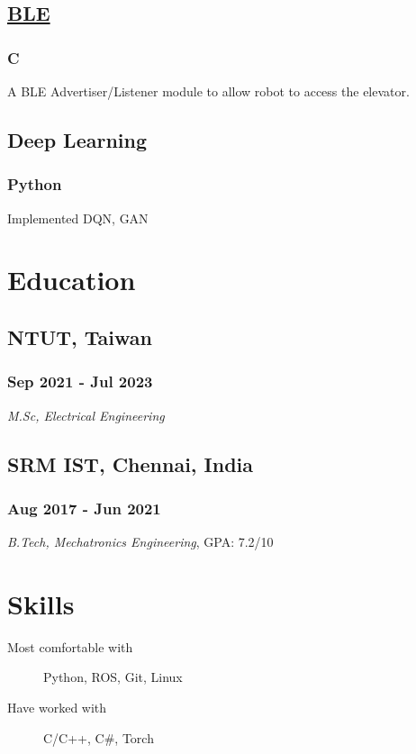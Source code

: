 \documentclass[letterpaper]{article}
\begin{document}
\subsection{\href{https://github.com/sudhanv09/BLE-Advertiser-Listener}{BLE}}
\label{sec:org314c2a3}
\subsubsection{C}
\label{sec:org1da0fac}
A BLE Advertiser/Listener module to allow robot to access the elevator.

\subsection{Deep Learning}
\label{sec:org4a51829}
\subsubsection{Python}
\label{sec:orgc500d5a}
Implemented DQN, GAN
\section{Education}
\label{sec:orge8f8733}
\subsection{NTUT, Taiwan}
\label{sec:org076ddca}
\subsubsection{Sep 2021 - Jul 2023}
\label{sec:org155cf7e}
\emph{M.Sc, Electrical Engineering}

\subsection{SRM IST, Chennai, India}
\label{sec:org3d5c7b3}
\subsubsection{Aug 2017 - Jun 2021}
\label{sec:org086b80f}
\emph{B.Tech, Mechatronics Engineering}, GPA: 7.2/10
\section{Skills}
\label{sec:orgf86a58e}
\begin{description}
\item[{Most comfortable with}] Python, ROS, Git, Linux
\item[{Have worked with}] C/C++, C\#, Torch
\end{description}
\end{document}
